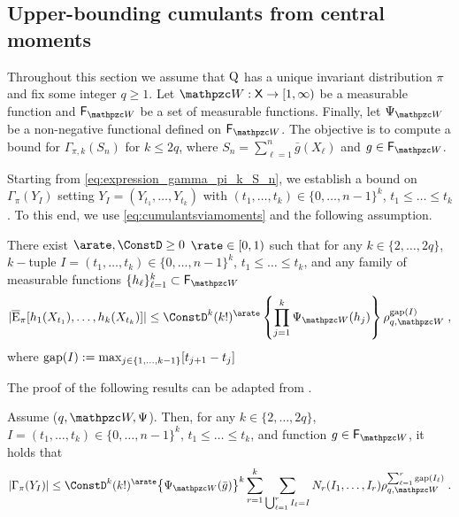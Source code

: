 \subsection{Upper-bounding cumulants from central moments}
\label{sec:cumulants_upper_bound_geom_ergodicity}
Throughout this section we assume that ${\rm Q}$ has a unique invariant distribution $\pi$ and fix some integer $q \geq 1$. Let $\lyapW: \Xset \to \coint{1,\infty}$ be a measurable function and $\setfunction_{\lyapW}$ be a set of
measurable functions. Finally, let $\normlike_{\lyapW}$ be a non-negative functional defined on $\setfunction_{\lyapW}$. The objective is to compute a bound for $\Gamma_{\pi, k}(S_n)$ for $k \leq 2q$, where $S_n= \sum_{\ell=1}^n \bar{g}(X_\ell)$ and $g \in \setfunction_{\lyapW}$.

Starting from \eqref{eq:expression_gamma_pi_k_S_n}, we establish a bound on $\Gamma_\pi(Y_I)$ setting $Y_I = (Y_{t_1},\ldots,Y_{t_k})$ with $ (t_1, \ldots, t_k)\in \{0,\ldots,n-1\}^{k}$, $t_1 \leq \dots\leq t_{k}$.
To this end, we use \eqref{eq:cumulantsviamoments} and the following assumption.
\begin{assumptionW}
\label{assum:central_moments_bound}
There exist $\arate,\ConstD \geq 0$ $\rate \in \coint{0,1}$ such that for any $k \in \{2,\dots,2q\}$, $k-$tuple $I = (t_1,\dots,t_k) \in \{0,\dots,n-1\}^{k}$, $t_1 \leq \dots \leq t_k$, and any family of measurable functions $\{h_{\ell}\}_{\ell=1}^{k} \subset \setfunction_{\lyapW}$
\begin{equation}
\label{eq:centred_moments_generic_assumption}
|\PEC_\pi[h_1(X_{t_1}), \ldots, h_k(X_{t_k})]| \leq \ConstD^{k} (k!)^{\arate}\left\{\prod_{j=1}^{k} \normlike_{\lyapW}(h_j)\right\}\rho_{q,\lyapW}^{\maxgap(I)}\eqsp,
\end{equation}
where $\operatorname{gap}(I) := \max_{j \in \{1,\dots,k-1\}}[t_{j+1}-t_{j}]$
\end{assumptionW}
The proof of the following results can be adapted from \cite{doukhan2007probability}. 
\begin{lemma}
\label{lem:cumulant_bounds_generic}
Assume ($q,\lyapW,\normlike$). Then, for any  $k \in \{2,\ldots,2q\}$,  $I=(t_1,\dots,t_{k}) \in \{0,\ldots,n-1\}^{k}$, $t_1 \leq \dots\leq t_{k}$, and function $g \in \setfunction_{\lyapW}$, it holds that
\begin{equation}
  |\Gamma_{\pi}(Y_I)| \leq \ConstD^{k} (k!)^{\arate} \bigl\{\normlike_{\lyapW}(\bar{g})\bigr\}^{k} \sum_{r=1}^{k}\sum_{\bigcup_{\ell=1}^r I_{\ell} = I} N_r(I_1, \ldots, I_r)    \rho_{q,\lyapW}^{\sum_{\ell=1}^{r}\maxgap(I_{\ell})}  \eqsp.
\end{equation}
\end{lemma}

